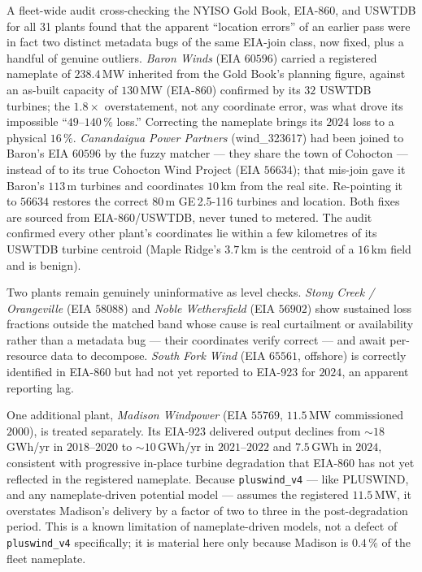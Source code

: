 \documentclass[11pt]{article}
\newcommand{\code}[1]{\texttt{\small #1}}
\begin{document}
A fleet-wide audit cross-checking the NYISO Gold Book, EIA-860, and
USWTDB for all 31 plants found that the apparent ``location errors'' of
an earlier pass were in fact two distinct metadata bugs of the same
EIA-join class, now fixed, plus a handful of genuine outliers.
\emph{Baron Winds} (EIA $60596$) carried a registered nameplate of
$238.4$\,MW inherited from the Gold Book's planning figure, against an
as-built capacity of $130$\,MW (EIA-860) confirmed by its $32$ USWTDB
turbines; the $1.8\times$ overstatement, not any coordinate error, was
what drove its impossible ``$49$--$140\,\%$ loss.'' Correcting the
nameplate brings its $2024$ loss to a physical $16\,\%$. \emph{Canandaigua
Power Partners} (wind\_323617) had been joined to Baron's EIA $60596$ by
the fuzzy matcher --- they share the town of Cohocton --- instead of to
its true Cohocton Wind Project (EIA $56634$); that mis-join gave it
Baron's $113$\,m turbines and coordinates $10$\,km from the real site.
Re-pointing it to $56634$ restores the correct $80$\,m GE\,2.5-116
turbines and location. Both fixes are sourced from EIA-860/USWTDB, never
tuned to metered. The audit confirmed every other plant's coordinates
lie within a few kilometres of its USWTDB turbine centroid (Maple
Ridge's $3.7$\,km is the centroid of a $16$\,km field and is benign).

Two plants remain genuinely uninformative as level checks. \emph{Stony
Creek / Orangeville} (EIA $58088$) and \emph{Noble Wethersfield} (EIA
$56902$) show sustained loss fractions outside the matched band whose
cause is real curtailment or availability rather than a metadata bug ---
their coordinates verify correct --- and await per-resource data to
decompose. \emph{South Fork Wind} (EIA $65561$, offshore) is correctly
identified in EIA-860 but had not yet reported to EIA-923 for $2024$, an
apparent reporting lag.

One additional plant, \emph{Madison Windpower} (EIA $55769$,
$11.5\,$MW commissioned $2000$), is treated separately. Its EIA-923
delivered output declines from
$\sim 18\,$GWh/yr in $2018$--$2020$ to $\sim 10\,$GWh/yr in $2021$--$2022$
and $7.5\,$GWh in $2024$, consistent with progressive in-place turbine
degradation that EIA-860 has not yet reflected in the registered
nameplate. Because \code{pluswind\_v4} --- like PLUSWIND, and any
nameplate-driven potential model --- assumes the registered $11.5\,$MW,
it overstates Madison's delivery by a factor of two
to three in the post-degradation period. This is a known limitation of
nameplate-driven models, not a defect of \code{pluswind\_v4}
specifically; it is material here only because Madison is $0.4\,\%$ of
the fleet nameplate.
\end{document}
